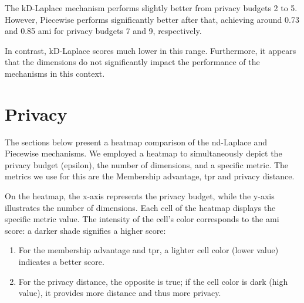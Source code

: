 {{\begin{figure}[H]
\begin{subfigure}[b]{0.85\textwidth}
\begin{subfigure}[c]{1\textwidth}
      \label{fig:ami_skewed-dataset_comparison_piecewise_2d}
    \end{subfigure}
  \end{subfigure}
\end{figure}
The kD-Laplace mechanism performs slightly better from privacy budgets 2 to 5. However, Piecewise performs significantly better after that, achieving around 0.73 and 0.85 \gls{ami} for privacy budgets 7 and 9, respectively.

In contrast, kD-Laplace scores much lower in this range. Furthermore, it appears that the dimensions do not significantly impact the performance of the mechanisms in this context.
\newpage
}

\section{Privacy}
The sections below present a heatmap comparison of the nd-Laplace and Piecewise mechanisms.
We employed a heatmap to simultaneously depict the privacy budget (epsilon), the number of dimensions, and a specific metric. The metrics we use for this are the Membership advantage, \gls{tpr} and privacy distance. 

On the heatmap, the x-axis represents the privacy budget, while the y-axis illustrates the number of dimensions. Each cell of the heatmap displays the specific metric value. The intensity of the cell's color corresponds to the \gls{ami} score: a darker shade signifies a higher score:
\begin{enumerate}
    \item  For the membership advantage and \gls{tpr}, a lighter cell color (lower value) indicates a better score.
    \item For the privacy distance, the opposite is true; if the cell color is dark (high value), it provides more distance and thus more privacy.
\end{enumerate}
\newpage
}

